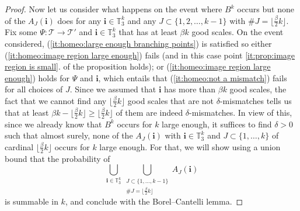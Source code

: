 \documentclass[JEP,XML,SOM,Unicode,NoFloatCountersInSection,published]{cedram}
\newcommand{\Tt}{\mathcal{T}}
\newcommand{\ii}{\mathbf{i}}
\theoremstyle{plain}
\theoremstyle{definition}
\begin{document}
\begin{proof}
Now let us consider what happens on the event where $B^k$ occurs but none of the $A_J(\ii)$ does for any $\ii \in \mathbb{T}_3^k$ and any $J\subset \{ 1,2,\dots, k-1\}$ with $\#J=\lfloor \frac{\beta}{2} k \rfloor$.
Fix some $\Psi:\Tt\rightarrow \Tt'$ and $\ii \in \mathbb{T}_3^k$ that has at least $\beta k$ good scales.
On the event considered, (\ref{it:homeo:large enough branching points}) is satisfied so either (\ref{it:homeo:image region large enough}) fails (and in this case point \ref{it:prop:image region is small}. of the proposition holds); or (\ref{it:homeo:image region large enough}) holds for $\Psi$ and $\ii$, which entails that (\ref{it:homeo:not a mismatch}) fails for all choices of $J$.
Since we assumed that $\ii$ has more than $\beta k$ good scales, the fact that we cannot find any $\lfloor \frac{\beta}{2}k\rfloor$ good scales that are not $\delta$-mismatches tells us that at least $\beta k - \lfloor \frac{\beta}{2}k\rfloor\geq \lfloor\frac{\beta}{2}k\rfloor$ of them are indeed $\delta$-mismatches.
In view of this, since we already know that $B^k$ occurs for $k$ large enough, it suffices to find $\delta>0$ such that almost surely, none of the $A_J(\ii)$ with $\ii \in \mathbb{T}_3^k$ and $J \subset \{1,\dots,k\}$ of cardinal $\lfloor \frac{\beta}{2}k \rfloor$ occurs for $k$ large enough. For that, we will show using a union bound that the probability of
\begin{equation}\label{eqn_rewriting_event_Aij}
\bigcup_{\ii \in \mathbb{T}_3^k} \bigcup_{\substack{J \subset \{1,\dots,k-1\}\\ \#J=\lfloor\frac{\beta}{2} k\rfloor }} A_J(\ii)
\end{equation}
is summable in $k$, and conclude with the Borel--Cantelli lemma.


\end{proof}
\end{document}
